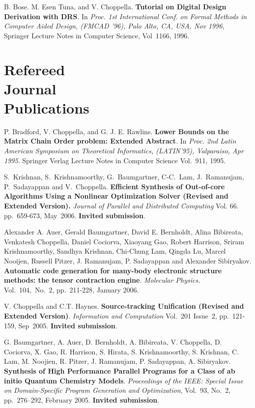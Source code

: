 \documentclass[11pt,margin,line]{res}
\begin{document}
\begin{resume}
B. Bose. M. Esen Tuna, and V. Choppella.  {\bf Tutorial on
Digital Design Derivation with DRS}.  In {\em {Proc. 1st
International Conf. on Formal Methods in Computer Aided
Design, (FMCAD '96), Palo Alto, CA, USA, Nov 1996}},
Springer Lecture Notes in Computer Science, Vol~1166, 1996.

\newpage

\section{\sc Refereed\\ Journal\\ Publications}

P. Bradford, V. Choppella, and G. J. E. Rawlins.  %
{\bf Lower
  Bounds on the Matrix Chain Order problem: Extended
  Abstract}.  In {\em {Proc. 2nd Latin American Symposium on
    Theoretical Informatics, (LATIN'95), Valparaiso, Apr
    1995}}.  Springer Verlag Lecture Notes in Computer
Science Vol.~911, 1995.


S.~Krishnan, S.~Krishnamoorthy, G.~Baumgartner, C-C.~Lam,
J.~Ramanujam, P.~Sadayappan and V.~Choppella.  {\bf
  Efficient Synthesis of Out-of-core Algorithms Using a
  Nonlinear Optimization Solver (Revised and Extended
  Version).}  {\em {Journal of Parallel and Distributed
    Computing}} Vol. 66. pp.~659-673, May~2006.  {\bf
  Invited submission}.

Alexander A. Auer, Gerald Baumgartner, David E. Bernholdt,
Alina Bibireata, Venkatesh Choppella, Daniel Cociorva,
Xiaoyang Gao, Robert Harrison, Sriram Krishnamoorthy,
Sandhya Krishnan, Chi-Chung Lam, Qingda Lu, Marcel Nooijen,
Russell Pitzer, J. Ramanujam, P. Sadayappan and Alexander
Sibiryakov.  {\bf Automatic code generation for many-body
electronic structure methods: the tensor contraction
engine}.  {\em Molecular Physics.} Vol.~104,~No.~2,
pp.~211-228, January 2006.

V. Choppella and C.T. Haynes.  {\bf Source-tracking
Unification (Revised and Extended Version)}.  {\em
{Information and Computation}} Vol.~201 Issue~2,
pp.~121-159, Sep~2005.  {\bf Invited submission}.

G. Baumgartner, A. Auer, D. Bernholdt, A. Bibireata,
V. Choppella, D. Cociorva, X. Gao, R. Harrison, S. Hirata,
S. Krishnamoorthy, S. Krishnan, C. Lam, M. Noojien,
R. Pitzer, J. Ramanujam, P. Sadayappan, A. Sibiryakov.  {\bf
Synthesis of High Performance Parallel Programs for a Class
of ab initio Quantum Chemistry Models}.  {\em {Proceedings
of the IEEE: Special Issue on Domain-Specific Program
Generation and Optimization}}, Vol.~93, No.~2, pp.~276--292,
February 2005.  {\bf Invited submission}.


\end{resume}
\end{document}
